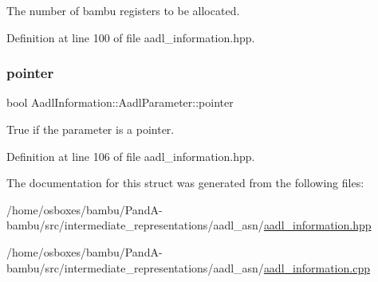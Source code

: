 The number of bambu registers to be allocated. 



Definition at line 100 of file aadl\+\_\+information.\+hpp.

\mbox{\label{structAadlInformation_1_1AadlParameter_a8f8d2acef296e4249679d6754641e746}} 
\subsubsection{\texorpdfstring{pointer}{pointer}}
{\footnotesize\ttfamily bool Aadl\+Information\+::\+Aadl\+Parameter\+::pointer}



True if the parameter is a pointer. 



Definition at line 106 of file aadl\+\_\+information.\+hpp.



The documentation for this struct was generated from the following files\+:\begin{DoxyCompactItemize}
\item 
/home/osboxes/bambu/\+Pand\+A-\/bambu/src/intermediate\+\_\+representations/aadl\+\_\+asn/\hyperlink{aadl__information_8hpp}{aadl\+\_\+information.\+hpp}\item 
/home/osboxes/bambu/\+Pand\+A-\/bambu/src/intermediate\+\_\+representations/aadl\+\_\+asn/\hyperlink{aadl__information_8cpp}{aadl\+\_\+information.\+cpp}\end{DoxyCompactItemize}
